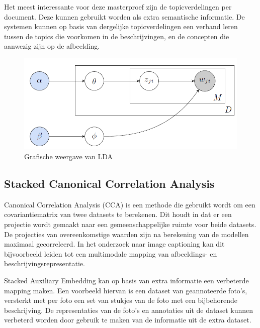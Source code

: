 Het meest interessante voor deze masterproef zijn de topicverdelingen per document. Deze kunnen gebruikt worden als extra semantische informatie. De systemen kunnen op basis van dergelijke topicverdelingen een verband leren tussen de topics die voorkomen in de beschrijvingen, en de concepten die aanwezig zijn op de afbeelding. 
\begin{figure}[tb]
    \centering
    \includegraphics[width=\linewidth]{Images/lda.png}
    \caption{Grafische weergave van LDA}
    \label{fig:lda}
\end{figure}


\subsection{Stacked Canonical Correlation Analysis}
\label{sub:stackedcca}
Canonical Correlation Analysis (CCA) is een methode die gebruikt wordt om een covariantiematrix van twee datasets te berekenen. Dit houdt in dat er een projectie wordt gemaakt naar een gemeenschappelijke ruimte voor beide datasets. De projecties van overeenkomstige waarden zijn na berekening van de modellen maximaal gecorreleerd. In het onderzoek naar image captioning kan dit bijvoorbeeld leiden tot een multimodale mapping van afbeeldings- en beschrijvingsrepresentatie.
 

Stacked Auxiliary Embedding  kan op basis van extra informatie een verbeterde mapping maken. Een voorbeeld hiervan is een dataset van geannoteerde foto's, versterkt met per foto een set van stukjes van de foto met een bijbehorende beschrijving. De representaties van de foto's en annotaties uit de dataset kunnen verbeterd worden door gebruik te maken van de informatie uit de extra dataset.

